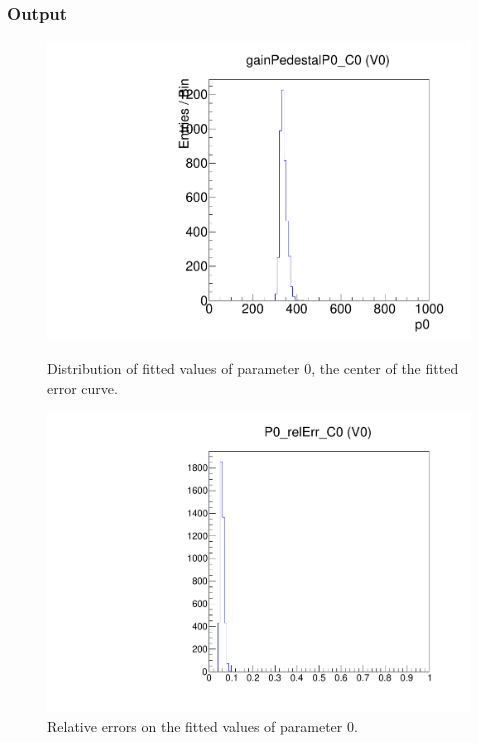 \subsubsection{Output}

\begin{figure}[!htp]
\centering
\begin{minipage}{0.45\textwidth}
  \includegraphics[width=1.0\textwidth]{figures/gainped_gainPedestalP0.pdf}
  \caption{Distribution of fitted values of parameter 0, the \vcal center of the fitted error curve.}
  \label{fig:gainped_gainPedestalP0}
\end{minipage}
\hspace{0.3cm}
\begin{minipage}{0.45\textwidth}
  \includegraphics[width=1.0\textwidth]{figures/gainped_P0_relErr.pdf}
  \caption{Relative errors on the fitted values of parameter 0.}
  \label{fig:gainped_P0_relErr}
\end{minipage}
\end{figure}

